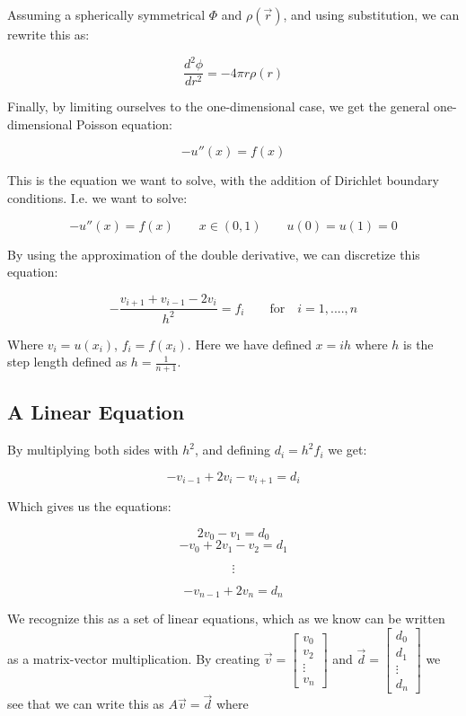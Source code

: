 \documentclass[a4paper,10pt,English]{article}
\begin{document}
Assuming a spherically symmetrical $\Phi$ and $\rho(\vec{r})$, and using substitution, we can rewrite this as:

\begin{equation}
    \frac{d^2 \phi}{dr^2} = -4\pi r \rho(r)
\end{equation}

Finally, by limiting ourselves to the one-dimensional case, we get the general one-dimensional Poisson equation:

\begin{equation}\label{eq:poisson}
    -u''(x) = f(x)
\end{equation}

This is the equation we want to solve, with the addition of Dirichlet boundary conditions. I.e. we want to solve:

$$-u''(x) = f(x) \qquad x \in (0, 1) \qquad u(0) = u(1) = 0$$

By using the approximation of the double derivative, we can discretize this equation:

\begin{equation} \label{eq: poi_disc}
    -\frac{v_{i+1} + v_{i-1} - 2v_i}{h^2} = f_i \qquad \text{for}  \quad i = 1,....,n
\end{equation}

Where $v_i = u(x_i)$, $f_i = f(x_i)$. Here we have defined $x = ih$ where $h$ is the step length defined as $h = \frac{1}{n+1}$.

\subsection{A Linear Equation}

By multiplying both sides with $h^2$, and defining $d_i = h^2 f_i$ we get:

$$-v_{i-1} + 2v_i - v_{i+1} = d_i$$

Which gives us the equations:

$$ 2v_0 - v_1 = d_0 $$
$$-v_0 + 2v_1 - v_2 = d_1$$

$$ \vdots $$

$$  -v_{n-1} + 2v_n = d_n$$

We recognize this as a set of linear equations, which as we know can be written as a matrix-vector multiplication. By creating $\vec{v} = \begin{bmatrix} v_0 \\ v_2 \\ \vdots \\ v_n \end{bmatrix}$ and $\vec{d} = \begin{bmatrix} d_0 \\ d_1 \\ \vdots \\ d_n \end{bmatrix}$ we see that we can write this as $A\vec{v} = \vec{d}$ where 
\end{document}

